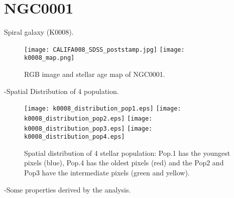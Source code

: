 \newpage
\section*{NGC0001}
Spiral galaxy (K0008).

\begin{figure}[bh]
\begin{center}
\texttt{[image: CALIFA008\_SDSS\_poststamp.jpg]}
\texttt{[image: k0008\_map.png]}
\caption{RGB image and stellar age map of NGC0001.}
   \label{fig1}
\end{center}
\end{figure}

-Spatial Distribution of 4 population.

\begin{figure}[bh]
\begin{center}
\texttt{[image: k0008\_distribution\_pop1.eps]}
\texttt{[image: k0008\_distribution\_pop2.eps]}
\texttt{[image: k0008\_distribution\_pop3.eps]}
\texttt{[image: k0008\_distribution\_pop4.eps]}
 \caption{Spatial distribution of 4 stellar population: Pop.1 has the youngest pixels (blue), Pop.4 has the oldest pixels (red) and the Pop2 and Pop3 have the intermediate pixels (green and yellow).}
   \label{fig1}
\end{center}
\end{figure}

-Some properties derived by the analysis.


